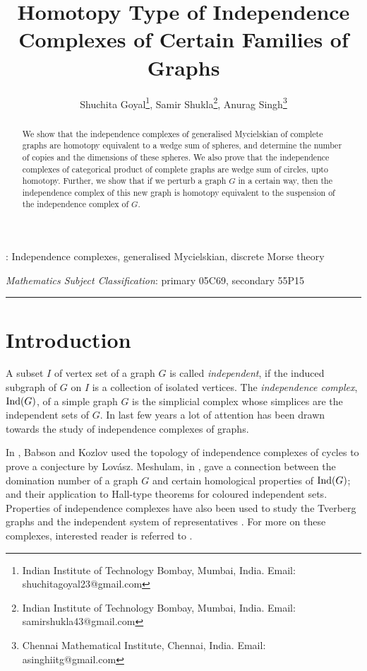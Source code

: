 \documentclass[12pt]{article}
\title{Homotopy Type of Independence Complexes of Certain Families of Graphs}
\author{Shuchita Goyal\footnote{Indian Institute of Technology Bombay, Mumbai, India. Email: shuchitagoyal23@gmail.com}, Samir Shukla\footnote{Indian Institute of Technology Bombay, Mumbai, India. Email: samirshukla43@gmail.com}, Anurag Singh\footnote{Chennai Mathematical Institute, Chennai, India. Email: asinghiitg@gmail.com}}
\numberwithin{thm}{section}
\theoremstyle{definition}
\newcommand{\ind}{{\rm{Ind}}}
\begin{document}
\date{ }


\maketitle
\begin{abstract}
We show that the independence complexes of generalised Mycielskian of complete graphs are homotopy equivalent to a wedge sum of spheres, and determine the  number of copies and the dimensions of these spheres. We also prove that  the independence complexes of categorical  product of complete graphs are wedge sum of circles, upto homotopy. Further, we show that if we perturb a  graph $G$ in a certain way, then the independence complex of this new graph is homotopy equivalent to the suspension of the independence complex of $G$.
\end{abstract}

 : Independence complexes, generalised Mycielskian, discrete Morse theory


 {\it Mathematics Subject Classification}: primary 05C69, secondary 55P15

\vspace{.1in}

\hrule

\section{Introduction}

 A subset $I$ of vertex set of a graph $G$ is called {\it independent}, if the  induced subgraph of $G$ on $I$ is a collection of isolated vertices. The {\it independence complex}, $\ind(G)$, of a simple graph $G$ is the simplicial complex whose simplices are the independent sets of $G$. In last few years a lot of attention has been drawn towards the study of independence complexes of graphs.  

In \cite{BK1},  Babson and Kozlov used the topology of independence complexes of cycles to prove a conjecture by Lov\'{a}sz. Meshulam, in \cite{RM}, gave a connection  between the domination number of a graph $G$ and certain homological properties of $\ind(G)$; and their application to Hall-type theorems for coloured  independent sets.  Properties of independence complexes have also been used to study the Tverberg graphs \cite{ea} and 
the independent  system of representatives \cite{abz}.
For more on these complexes, interested reader  is referred to
\cite{Bar13, BLN, BB, csorba, eh, ea1,ea2, kk}. 
\end{document}
